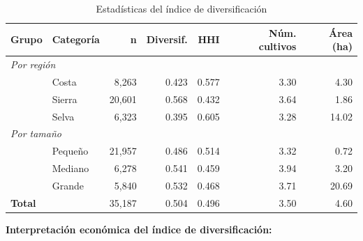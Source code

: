 \documentclass[11pt,a4paper]{article}
\begin{document}
\begin{table}[H]
\centering
\caption{Estadísticas del índice de diversificación}
\label{tab:diversif_detail}
\begin{threeparttable}
\small
\begin{tabular}{llrrrrr}
\toprule
\textbf{Grupo} & \textbf{Categoría} & \textbf{n} & \textbf{Diversif.} & \textbf{HHI} & \textbf{Núm. cultivos} & \textbf{Área (ha)} \\
\midrule
\multicolumn{7}{l}{\textit{Por región}} \\
& Costa & 8,263 & 0.423 & 0.577 & 3.30 & 4.30 \\
& Sierra & 20,601 & 0.568 & 0.432 & 3.64 & 1.86 \\
& Selva & 6,323 & 0.395 & 0.605 & 3.28 & 14.02 \\
\midrule
\multicolumn{7}{l}{\textit{Por tamaño}} \\
& Pequeño & 21,957 & 0.486 & 0.514 & 3.32 & 0.72 \\
& Mediano & 6,278 & 0.541 & 0.459 & 3.94 & 3.20 \\
& Grande & 5,840 & 0.532 & 0.468 & 3.71 & 20.69 \\
\midrule
\textbf{Total} & & 35,187 & 0.504 & 0.496 & 3.50 & 4.60 \\
\bottomrule
\end{tabular}
\end{threeparttable}
\end{table}

\textbf{Interpretación económica del índice de diversificación:}
\end{document}
